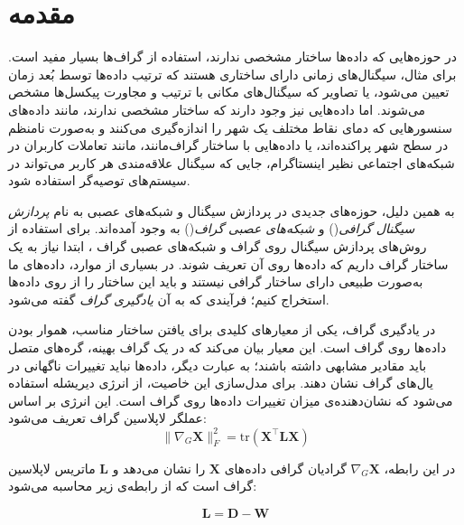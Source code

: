 \documentclass[10pt,twocolumn,a4paper]{article}
\begin{document}
    \section{مقدمه}
    در حوزه‌هایی که داده‌ها ساختار مشخصی ندارند، استفاده از گراف‌ها بسیار مفید است. برای مثال، سیگنال‌های زمانی دارای ساختاری هستند که ترتیب داده‌ها توسط بُعد زمان تعیین می‌شود، یا تصاویر که سیگنال‌های مکانی با ترتیب و مجاورت پیکسل‌ها مشخص می‌شوند. اما داده‌هایی نیز وجود دارند که ساختار مشخصی ندارند، مانند داده‌های سنسورهایی که دمای نقاط مختلف یک شهر را اندازه‌گیری می‌کنند و به‌صورت نامنظم در سطح شهر پراکنده‌اند، یا داده‌هایی با ساختار گراف‌مانند، مانند تعاملات کاربران در شبکه‌های اجتماعی نظیر اینستاگرام، جایی که سیگنال علاقه‌مندی هر کاربر می‌تواند در سیستم‌های توصیه‌گر استفاده شود.
    
    به همین دلیل، حوزه‌های جدیدی در پردازش سیگنال و شبکه‌های عصبی به نام 
	\textit{پردازش سیگنال گرافی}()\cite{GSP}
     و
	\textit{شبکه‌های عصبی گراف}()\cite{GNN}
      به وجود آمده‌اند.
      برای استفاده از روش‌های پردازش سیگنال روی گراف و شبکه‌های عصبی گراف ، ابتدا نیاز به یک ساختار گراف داریم که داده‌ها روی آن تعریف شوند. در بسیاری از موارد، داده‌های ما به‌صورت طبیعی دارای ساختار گرافی نیستند و باید این ساختار را از روی داده‌ها استخراج کنیم؛ فرآیندی که به آن 
            \textit{یادگیری گراف}
      گفته می‌شود.
      
     

     
     
     
     در یادگیری گراف، یکی از معیارهای کلیدی برای یافتن ساختار مناسب، هموار بودن داده‌ها روی گراف است. این معیار بیان می‌کند که در یک گراف بهینه، گره‌های متصل باید مقادیر مشابهی داشته باشند؛ به عبارت دیگر، داده‌ها نباید تغییرات ناگهانی در یال‌های گراف نشان دهند. برای مدل‌سازی این خاصیت، از انرژی دیریشله استفاده می‌شود که نشان‌دهنده‌ی میزان تغییرات داده‌ها روی گراف است. این انرژی بر اساس عملگر لاپلاسین گراف تعریف می‌شود:
     \begin{equation}
     	     \|\nabla_G \bm{X}\|_F^2 = \text{tr} (\bm{X}^\top \bm{L} \bm{X})
     \end{equation}
     
     در این رابطه، \( \nabla_G \bm{X} \) گرادیان گرافی داده‌های \( \bm{X} \) را نشان می‌دهد و \( \bm{L} \) ماتریس لاپلاسین گراف است که از رابطه‌ی زیر محاسبه می‌شود:
     
\begin{equation}\label{eq:defL}
	     \bm{L} = \bm{D} - \bm{W}
\end{equation}
     
\end{document}
